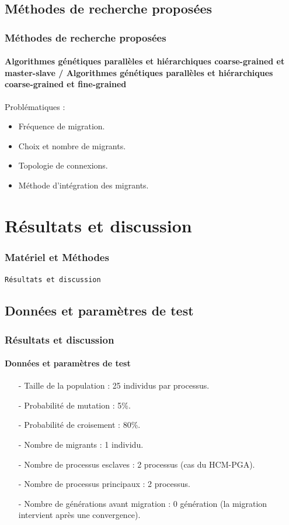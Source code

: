 \documentclass[11pt]{beamer}
\begin{document}
 \subsection{Méthodes de recherche proposées}
 
 \begin{frame}
 \frametitle{Méthodes de recherche proposées}
 \framesubtitle{Algorithmes génétiques parallèles et hiérarchiques coarse-grained et
master-slave / Algorithmes génétiques parallèles et hiérarchiques coarse-grained et
fine-grained}
	
	Problématiques :
	\begin{itemize}
		\item Fréquence de migration.
		\item Choix et nombre de migrants.
		\item Topologie de connexions.
		\item Méthode d’intégration des migrants.
	\end{itemize}
	
 \end{frame} 
 
 \section{Résultats et discussion}
 
 \begin{frame}
 	\frametitle{Matériel et Méthodes}
 	\begin{center}
 		\LARGE{\texttt{Résultats et discussion}}
 	\end{center}
 \end{frame}   
 
 
 \subsection{Données et paramètres de test}
 \begin{frame}
 \frametitle{Résultats et discussion}
 \framesubtitle{Données et paramètres de test}
 \begin{itemize}
					\item[-] Taille de la population : 25 individus par processus.
			        \item[-] Probabilité de mutation : 5\%.
			        \item[-] Probabilité de croisement : 80\%.
			        \item[-] Nombre de migrants : 1 individu.
		 	        \item[-] Nombre de processus esclaves : 2 processus (cas du HCM-PGA).
			        \item[-] Nombre de processus principaux : 2 processus.
			        \item[-] Nombre de générations avant migration : 0 génération (la migration intervient après une convergence).
				\end{itemize}
 \end{frame}
 
\end{document}

